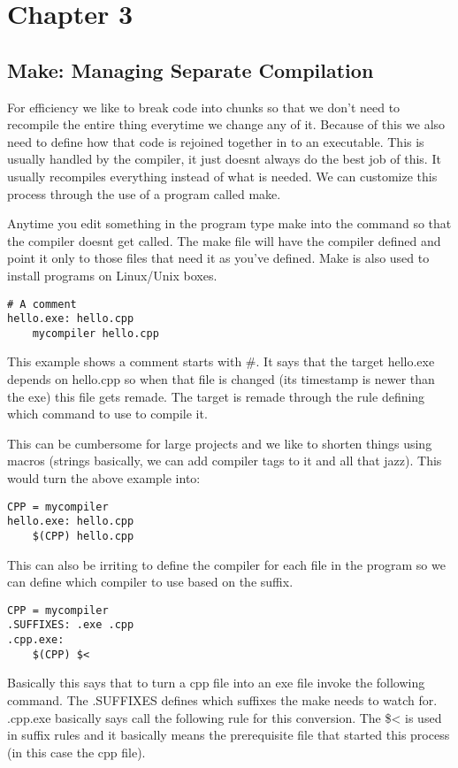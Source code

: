 \documentclass[12pt]{article}
\begin{document}
\section*{Chapter 3}
\subsection*{Make: Managing Separate Compilation}
For efficiency we like to break code into chunks so that we don't need to recompile the entire thing everytime we change any of it. Because of this we also need to define how that code is rejoined together in to an executable. This is usually handled by the compiler, it just doesnt always do the best job of this. It usually recompiles everything instead of what is needed. We can customize this process through the use of a program called make.

Anytime you edit something in the program type make into the command so that the compiler doesnt get called. The make file will have the compiler defined and point it only to those files that need it as you've defined. Make is also used to install programs on Linux/Unix boxes.

\begin{lstlisting}
# A comment
hello.exe: hello.cpp
    mycompiler hello.cpp
\end{lstlisting}
This example shows a comment starts with \#. It says that the target hello.exe depends on hello.cpp so when that file is changed (its timestamp is newer than the exe) this file gets remade. The target is remade through the rule defining which command to use to compile it.

This can be cumbersome for large projects and we like to shorten things using macros (strings basically, we can add compiler tags to it and all that jazz). This would turn the above example into:
\begin{lstlisting}
CPP = mycompiler
hello.exe: hello.cpp
    $(CPP) hello.cpp
\end{lstlisting}

This can also be irriting to define the compiler for each file in the program so we can define which compiler to use based on the suffix.
\begin{lstlisting}
CPP = mycompiler
.SUFFIXES: .exe .cpp
.cpp.exe:
    $(CPP) $<
\end{lstlisting}

Basically this says that to turn a cpp file into an exe file invoke the following command. The .SUFFIXES defines which suffixes the make needs to watch for.  .cpp.exe basically says call the following rule for this conversion. The \$<  is used in suffix rules and it basically means the prerequisite file that started this process (in this case the cpp file).
\end{document}

